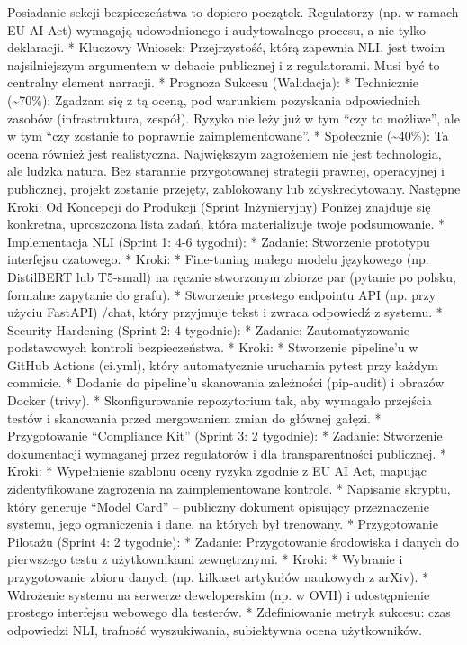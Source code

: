 \documentclass[letterpaper,twocolumn]{article}
\begin{document}
Posiadanie sekcji bezpieczeństwa to dopiero początek. Regulatorzy (np. w
ramach EU AI Act) wymagają udowodnionego i audytowalnego procesu, a nie
tylko deklaracji. * Kluczowy Wniosek: Przejrzystość, którą zapewnia NLI,
jest twoim najsilniejszym argumentem w debacie publicznej i z
regulatorami. Musi być to centralny element narracji. * Prognoza Sukcesu
(Walidacja): * Technicznie (\textasciitilde70\%): Zgadzam się z tą
oceną, pod warunkiem pozyskania odpowiednich zasobów (infrastruktura,
zespół). Ryzyko nie leży już w tym ``czy to możliwe'', ale w tym ``czy
zostanie to poprawnie zaimplementowane''. * Społecznie
(\textasciitilde40\%): Ta ocena również jest realistyczna. Największym
zagrożeniem nie jest technologia, ale ludzka natura. Bez starannie
przygotowanej strategii prawnej, operacyjnej i publicznej, projekt
zostanie przejęty, zablokowany lub zdyskredytowany. Następne Kroki: Od
Koncepcji do Produkcji (Sprint Inżynieryjny) Poniżej znajduje się
konkretna, uproszczona lista zadań, która materializuje twoje
podsumowanie. * Implementacja NLI (Sprint 1: 4-6 tygodni): * Zadanie:
Stworzenie prototypu interfejsu czatowego. * Kroki: * Fine-tuning małego
modelu językowego (np. DistilBERT lub T5-small) na ręcznie stworzonym
zbiorze par (pytanie po polsku, formalne zapytanie do grafu). *
Stworzenie prostego endpointu API (np. przy użyciu FastAPI) /chat, który
przyjmuje tekst i zwraca odpowiedź z systemu. * Security Hardening
(Sprint 2: 4 tygodnie): * Zadanie: Zautomatyzowanie podstawowych
kontroli bezpieczeństwa. * Kroki: * Stworzenie pipeline'u w GitHub
Actions (ci.yml), który automatycznie uruchamia pytest przy każdym
commicie. * Dodanie do pipeline'u skanowania zależności (pip-audit) i
obrazów Docker (trivy). * Skonfigurowanie repozytorium tak, aby wymagało
przejścia testów i skanowania przed mergowaniem zmian do głównej gałęzi.
* Przygotowanie ``Compliance Kit'' (Sprint 3: 2 tygodnie): * Zadanie:
Stworzenie dokumentacji wymaganej przez regulatorów i dla
transparentności publicznej. * Kroki: * Wypełnienie szablonu oceny
ryzyka zgodnie z EU AI Act, mapując zidentyfikowane zagrożenia na
zaimplementowane kontrole. * Napisanie skryptu, który generuje ``Model
Card'' -- publiczny dokument opisujący przeznaczenie systemu, jego
ograniczenia i dane, na których był trenowany. * Przygotowanie Pilotażu
(Sprint 4: 2 tygodnie): * Zadanie: Przygotowanie środowiska i danych do
pierwszego testu z użytkownikami zewnętrznymi. * Kroki: * Wybranie i
przygotowanie zbioru danych (np. kilkaset artykułów naukowych z arXiv).
* Wdrożenie systemu na serwerze deweloperskim (np. w OVH) i
udostępnienie prostego interfejsu webowego dla testerów. * Zdefiniowanie
metryk sukcesu: czas odpowiedzi NLI, trafność wyszukiwania, subiektywna
ocena użytkowników.
\end{document}
